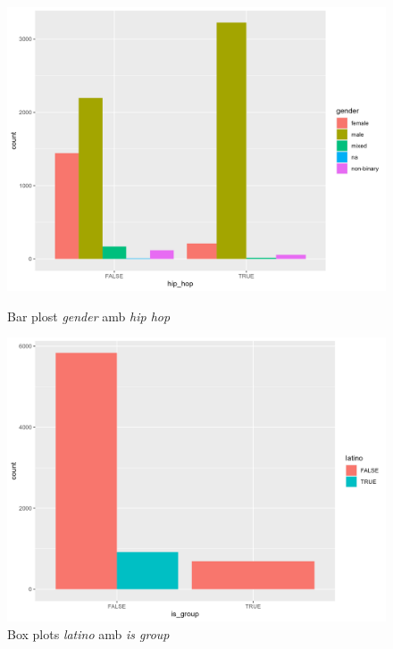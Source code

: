 \begin{figure}[H]
\centering
    \begin{minipage}{.4\textwidth}
        \centering
        \includegraphics[width=0.95\linewidth]{Images/2_Bivariate/hiphopgender.png}
        \caption{Bar plost \textit{gender} amb \textit{hip hop}}
        \label{fig:BivariateR_hiphopgender}
    \end{minipage}%
    \begin{minipage}{.4\textwidth}
        \centering
        \includegraphics[width=0.95\linewidth]{Images/2_Bivariate/latinogroup.png}
        \caption{Box plots \textit{latino} amb \textit{is group}}
        \label{fig:BivariateR_latinogroup}
    \end{minipage}%
\end{figure}

